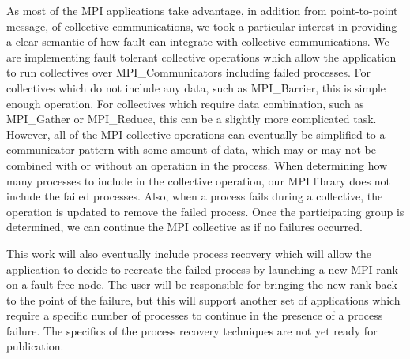 As most of the MPI applications take advantage, in addition from point-to-point
message, of collective communications, we took a particular interest in
providing a clear semantic of how fault can integrate with collective
communications. We are implementing fault
tolerant collective operations which allow the application to run collectives
over MPI\_Communicators including failed processes. For collectives which do not
include any data, such as MPI\_Barrier, this is simple enough operation.  For
collectives which require data combination, such as MPI\_Gather or MPI\_Reduce,
this can be a slightly more complicated task. However, all of the MPI collective
operations can eventually be simplified to a communicator pattern with some
amount of data, which may or may not be combined with or without an operation in
the process. When determining how many processes to include in the collective
operation, our MPI library does not include the failed processes. Also, when a
process fails during a collective, the operation is updated to remove the failed
process. Once the participating group is determined, we can continue the MPI
collective as if no failures occurred.

This work will also eventually include process recovery which will allow the
application to decide to recreate the failed process by launching a new MPI rank
on a fault free node. The user will be responsible for bringing the new rank
back to the point of the failure, but this will support another set of
applications which require a specific number of processes to continue in the
presence of a process failure.  The specifics of the process recovery techniques
are not yet ready for publication.
